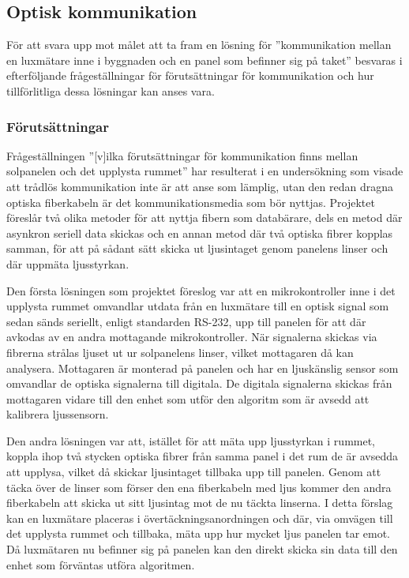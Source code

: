     \subsection{Optisk kommunikation} %
    \label{sub:optisk_kommunikation}
        För att svara upp mot målet att ta fram en lösning för ''kommunikation mellan en luxmätare inne i byggnaden och en panel som befinner sig på taket'' besvaras i efterföljande frågeställningar för förutsättningar för kommunikation och hur tillförlitliga dessa lösningar kan anses vara.

        \subsubsection{Förutsättningar} %
        \label{sub:forutsattningar}
                
            Frågeställningen ''[v]ilka förutsättningar för kommunikation finns mellan solpanelen och det upplysta rummet'' har resulterat i en undersökning som visade att trådlös kommunikation inte är att anse som lämplig, utan den redan dragna optiska fiberkabeln är det kommunikationsmedia som bör nyttjas. Projektet föreslår två olika metoder för att nyttja fibern som databärare, dels en metod där asynkron seriell data skickas och en annan metod där två optiska fibrer kopplas samman, för att på sådant sätt skicka ut ljusintaget genom panelens linser och där uppmäta ljusstyrkan.\bigskip

            Den första lösningen som projektet föreslog var att en mikrokontroller inne i det upplysta rummet omvandlar utdata från en luxmätare till en optisk signal som sedan sänds seriellt, enligt standarden RS-232, upp till panelen för att där avkodas av en andra mottagande mikrokontroller. När signalerna skickas via fibrerna strålas ljuset ut ur solpanelens linser, vilket mottagaren då kan analysera. Mottagaren är monterad på panelen och har en ljuskänslig sensor som omvandlar de optiska signalerna till digitala. De digitala signalerna skickas från mottagaren vidare till den enhet som utför den algoritm som är avsedd att kalibrera ljussensorn. \bigskip

            Den andra lösningen var att, istället för att mäta upp ljusstyrkan i rummet, koppla ihop två stycken optiska fibrer från samma panel i det rum de är avsedda att upplysa, vilket då skickar ljusintaget tillbaka upp till panelen. Genom att täcka över de linser som förser den ena fiberkabeln med ljus kommer den andra fiberkabeln att skicka ut sitt ljusintag mot de nu täckta linserna. I detta förslag kan en luxmätare placeras i övertäckningsanordningen och där, via omvägen till det upplysta rummet och tillbaka, mäta upp hur mycket ljus panelen tar emot. Då luxmätaren nu befinner sig på panelen kan den direkt skicka sin data till den enhet som förväntas utföra algoritmen.

